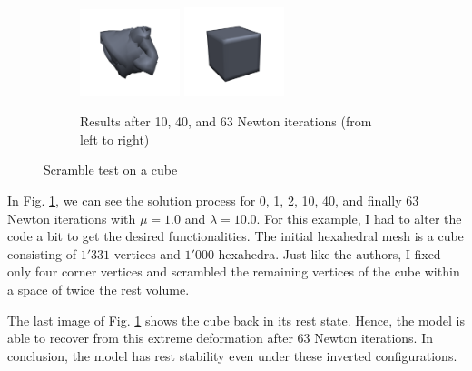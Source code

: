 \begin{figure}[!htbp]
\begin{subfigure}[b]{\textwidth}
        \hfill
        \includegraphics[width=0.32\textwidth]{resources/scramble_04_new.png}
        \hfill
        \includegraphics[width=0.32\textwidth]{resources/scramble_05_new.png}
        \caption{Results after 10, 40, and 63 Newton iterations (from left to right)}
    \end{subfigure}
    \caption{Scramble test on a cube}
    \label{fig:scramble}
\end{figure}

In Fig. \ref{fig:scramble}, we can see the solution process for 0, 1, 2, 10, 40, and finally 63 Newton iterations with $\mu=1.0$ and $\lambda = 10.0$. For this example, I had to alter the code a bit to get the desired functionalities. The initial hexahedral mesh is a cube consisting of $1'331$ vertices and $1'000$ hexahedra. Just like the authors, I fixed only four corner vertices and scrambled the remaining vertices of the cube within a space of twice the rest volume. 

The last image of Fig. \ref{fig:scramble} shows the cube back in its rest state. Hence, the model is able to recover from this extreme deformation after 63 Newton iterations. In conclusion, the model has rest stability even under these inverted configurations.

